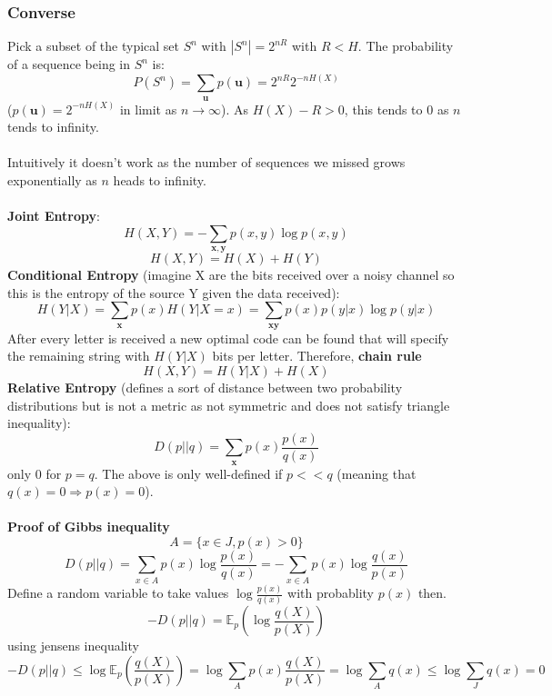 \documentclass{article}
\begin{document}
\subsubsection{Converse}
Pick a subset of the typical set $S^n$ with $|S^n| = 2^{n R}$ with $R< H$. The probability of a sequence being in $S^n$ is:
$$
P(S^n) = \sum_{\bm u} p(\bm u) = 2^{n R}2^{-n H(X)}
$$
($p(\bm u) = 2^{-n H(X)}$ in limit as $n \rightarrow \infty$). As $H(X) - R  > 0$, this tends to $0$ as $n$ tends to infinity.\\\\
Intuitively it doesn't work as the number of sequences we missed grows exponentially as $n$ heads to infinity.\\\\
\textbf{Joint Entropy}:
\begin{equation}
    H(X,Y) = - \sum_{\bm x, \bm y} p(x,y) \log p(x,y)
\end{equation}
$$
H(X,Y)=H(X) + H(Y)
$$
\textbf{Conditional Entropy} (imagine X are the bits received over a noisy channel so this is the entropy of the source Y given the data received):
\begin{equation}
    H(Y|X) = \sum_{\bm x} p(x)H(Y|X=x) = \sum_{\bm x \bm y} p(x)p(y|x)\log p(y|x)
\end{equation}
After every letter is received a new optimal code can be found that will specify the remaining string with $H(Y|X)$ bits per letter. Therefore, \textbf{chain rule}
\begin{equation}
    H(X,Y) = H(Y|X)+H(X)
\end{equation}
\textbf{Relative Entropy} (defines a sort of distance between two probability distributions but is not a metric as not symmetric and does not satisfy triangle inequality):
\begin{equation}
    D(p||q) = \sum_{\bm x} p(x) \frac{p(x)}{q(x)}
\end{equation}
only 0 for $p = q$. The above is only well-defined if $p << q$ (meaning that $q(x) =0 \Rightarrow p(x) = 0$).\\\\
\textbf{Proof of Gibbs inequality}
$$
A  = \{ x \in J, p(x) > 0 \}
$$
$$
D(p||q) = \sum_{x \in A} p(x) \log \frac{p(x)}{q(x)} = -\sum_{x \in A} p(x) \log \frac{q(x)}{p(x)}
$$
Define a random variable to take values $\log \frac{p(x)}{q(x)}$ with probablity $p(x)$ then.
$$
-D(p||q) = \mathbb{E}_p(\log \frac{q(X)}{p(X)})
$$
using jensens inequality
$$
-D(p||q) \leq \log \mathbb{E}_p( \frac{q(X)}{p(X)}) = \log \sum_{A} p(x) \frac{q(X)}{p(X)} = \log \sum_A q(x) \leq \log \sum_{J} q(x) = 0
$$
\end{document}
